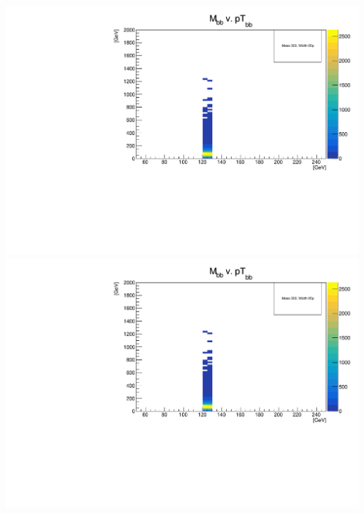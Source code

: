 \documentclass[a4wide,10pt]{article}
\begin{document}
\includegraphics[scale=0.50,page=40]{../Pdfs/dib_Mass_Versus_dib_TransverseMomentum_VaryingWidths.pdf}
\includegraphics[scale=0.50,page=41]{../Pdfs/dib_Mass_Versus_dib_TransverseMomentum_VaryingWidths.pdf}
\end{document}
